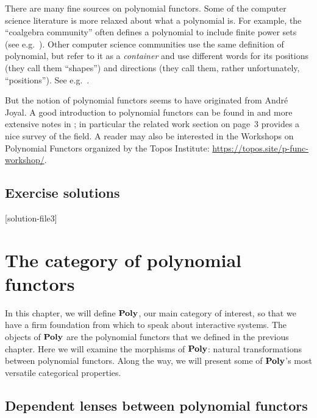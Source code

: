 \documentclass[Book-Poly]{subfiles}
\begin{document}
There are many fine sources on polynomial functors. Some of the computer science literature is more relaxed about what a polynomial is. For example, the ``coalgebra community'' often defines a polynomial to include finite power sets (see e.g.\ \cite{jacobs2017introduction}). Other computer science communities use the same definition of polynomial, but refer to it as a \emph{container} and use different words for its positions (they call them ``shapes'') and directions (they call them, rather unfortunately, ``positions''). See e.g.\ \cite{abbot2003categoriesthesis,abbott2005containers}.

But the notion of polynomial functors seems to have originated from Andr\'{e} Joyal. A good introduction to polynomial functors can be found in \cite{kock2012polynomial} and more extensive notes in \cite{kock2016}; in particular the related work section on page~3 provides a nice survey of the field. A reader may also be interested in the Workshops on Polynomial Functors organized by the Topos Institute: \url{https://topos.site/p-func-workshop/}.

\section{Exercise solutions}
{\footnotesize
    }

[solution-file3]

\chapter{The category of polynomial functors} \label{ch.poly.cat}


In this chapter, we will define $\mathbf{Poly}$, our main category of interest, so that we have a firm foundation from which to speak about interactive systems.
The objects of $\mathbf{Poly}$ are the polynomial functors that we defined in the previous chapter.
Here we will examine the morphisms of $\mathbf{Poly}$: natural transformations between polynomial functors.
Along the way, we will present some of $\mathbf{Poly}$'s most versatile categorical properties.

\section{Dependent lenses between polynomial functors}
\label{sec.poly.cat.morph}
\end{document}
